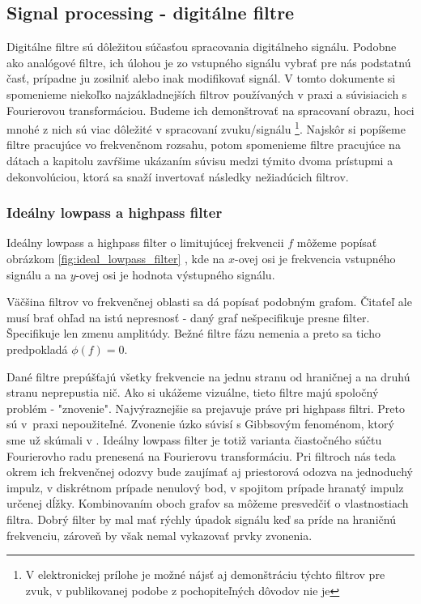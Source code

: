 \subsection{Signal processing - digitálne filtre}
Digitálne filtre sú dôležitou súčasťou spracovania digitálneho
signálu. Podobne ako analógové filtre, ich úlohou je zo vstupného
signálu vybrať pre nás podstatnú časť, prípadne ju zosilniť alebo inak
modifikovať signál. V tomto dokumente si spomenieme niekoľko 
najzákladnejších filtrov používaných v praxi a súvisiacich s Fourierovou
transformáciou. Budeme ich demonštrovať na spracovaní obrazu, hoci
mnohé z nich sú viac dôležité v spracovaní zvuku/signálu 
\footnote{V elektronickej prílohe je možné nájsť aj demonštráciu 
týchto filtrov pre zvuk, v publikovanej podobe z pochopiteľných
dôvodov nie je
}.
Najskôr si popíšeme filtre pracujúce vo frekvenčnom rozsahu, potom
spomenieme filtre pracujúce na  dátach a kapitolu
zavŕšime ukázaním súvisu medzi týmito dvoma prístupmi a
dekonvolúciou, ktorá sa snaží invertovať následky nežiadúcich filtrov.

\subsubsection{Ideálny lowpass a highpass filter}
Ideálny lowpass a highpass filter o limitujúcej frekvencii $f$ môžeme
popísať obrázkom \ref{fig:ideal_lowpass_filter} , 
kde na $x$-ovej osi je frekvencia
vstupného signálu a na $y$-ovej osi je hodnota výstupného signálu.
\begin{poznamka}
    Väčšina filtrov vo frekvenčnej oblasti sa dá popísať podobným grafom.
    Čitaťeľ ale musí brať ohľad na istú nepresnosť - daný graf
    nešpecifikuje presne filter. Špecifikuje len zmenu amplitúdy.
    Bežné filtre fázu nemenia a preto sa ticho predpokladá $\phi(f)=0$.
\end{poznamka}

Dané filtre prepúšťajú všetky frekvencie na jednu stranu od hraničnej
a na druhú stranu neprepustia nič. Ako si ukážeme vizuálne, tieto
filtre majú spoločný problém - "znovenie". Najvýraznejšie sa prejavuje
práve pri highpass filtri. Preto sú v~praxi nepoužiteľné.
Zvonenie úzko súvisí s Gibbsovým fenoménom, ktorý sme už skúmali v
\todo{}. Ideálny lowpass filter je totiž varianta čiastočného súčtu
Fourierovho radu prenesená na Fourierovu transformáciu. Pri filtroch
nás teda okrem ich frekvenčnej odozvy bude zaujímať aj priestorová
odozva na jednoduchý impulz, v diskrétnom prípade nenulový bod, v
spojitom prípade hranatý impulz určenej dĺžky. Kombinovaním oboch
grafov sa môžeme presvedčiť o vlastnostiach filtra. Dobrý filter by
mal mať rýchly úpadok signálu keď sa príde na hraničnú frekvenciu,
zároveň by však nemal vykazovať prvky zvonenia.


